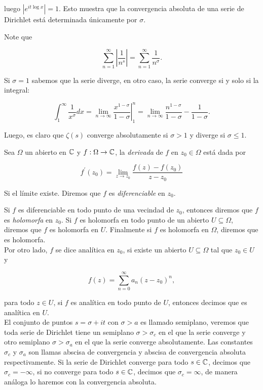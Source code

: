 luego $\left| e^{\displaystyle it\log x}\right|=1$. Esto muestra que la convergencia absoluta de una serie de Dirichlet está determinada únicamente por $\sigma$.

\begin{eg}
Note que

$$\sum_{n=1}^{\infty} \left|\frac{1}{n^s}\right|=\sum_{n=1}^{\infty} \frac{1}{n^{\sigma}}.$$

Si $\sigma=1$ sabemos que la serie diverge, en otro caso, la serie converge si y solo si la integral:

$$\int_1^{\infty}\frac{1}{x^\sigma}dx=\lim_{n \to \infty}\left.\dfrac{x^{1-\sigma}}{1-\sigma}\right|_1^{n}=\lim _{n \rightarrow \infty} \frac{n^{1-\sigma}}{1-\sigma}-\frac{1}{1-\sigma}.$$

Luego, es claro que $\zeta(s)$ converge absolutamente si $\sigma>1$ y diverge  si $\sigma\leq 1$.
\end{eg}

\begin{definition}
Sea $\Omega$ un abierto en $\mathbb{C}$ y $f:\Omega \to \mathbb{C}$, la \textit{derivada} de $f$ en $z_0\in \Omega$ está dada por

$$f^{\prime}(z_0)=\lim_{z \to z_0} \frac{f(z)-f(z_0)}{z-z_0}$$

Si el límite existe. Diremos que $f$ es \textit{diferenciable} en $z_0$.
\end{definition}

Si $f$ es diferenciable en todo punto de una vecindad de $z_0$, entonces diremos que $f$ es \textit{holomorfa} en $z_0$. Si $f$ es holomorfa en todo punto de un abierto $U\subseteq\Omega$, diremos que $f$ es holomorfa en $U$. Finalmente si $f$ es holomorfa en $\Omega$, diremos que es holomorfa.\\

Por otro lado, $f$ se dice analítica en $z_0$, si existe un abierto $U\subseteq \Omega$ tal que $z_0\in U$ y

$$f(z)=\sum_{n=0}^{\infty} a_n (z-z_0)^n,$$

para todo $z\in U$, si $f$ es analítica en todo punto de $U$, entonces decimos que es analítica  en $U$.\\

El conjunto de puntos $s=\sigma+it$ con $\sigma>a$ es llamado semiplano, veremos que toda serie de Dirichlet tiene un semiplano $\sigma>\sigma_c$ en el que la serie converge y otro semiplano $\sigma>\sigma_a$ en el que la serie converge absolutamente. Las constantes $\sigma_c$ y $\sigma_a$ son llamas abscisa de convergencia y abscisa de convergencia absoluta respectivamente. Si la serie de Dirichlet converge para todo $s\in \mathbb{C}$, decimos que $\sigma_c=-\infty$, si no converge para todo $s\in \mathbb{C}$, decimos que $\sigma_c=\infty$, de manera análoga lo haremos con la convergencia absoluta.\cite{pongsriiam2023analytic}


